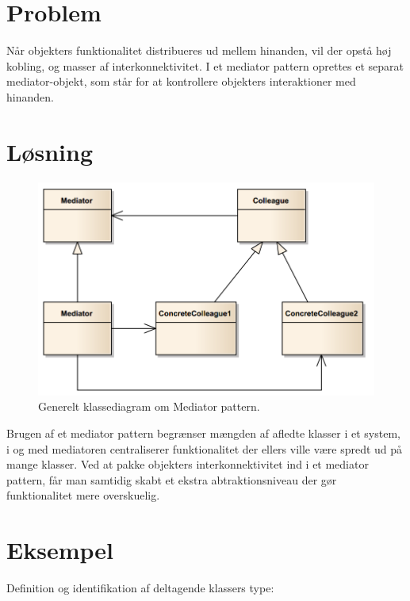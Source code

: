 \section{Problem}
Når objekters funktionalitet distribueres ud mellem hinanden, vil der opstå høj kobling, og masser af interkonnektivitet.  I et mediator pattern oprettes et separat mediator-objekt, som står for at kontrollere objekters interaktioner med hinanden. 

\section{Løsning}

\begin{figure}[h]
	\centering
	\includegraphics[width=\linewidth]{figs/concrete}
	\caption{Generelt klassediagram om Mediator pattern.}
	\label{fig:concrete}
\end{figure}

Brugen af et mediator pattern begrænser mængden af afledte klasser i et system, i og med mediatoren centraliserer funktionalitet der ellers ville være spredt ud på mange klasser. Ved at pakke objekters interkonnektivitet ind i et mediator pattern, får man samtidig skabt et ekstra abtraktionsniveau der gør funktionalitet mere overskuelig.

\section{Eksempel}
Definition og identifikation af deltagende klassers type:

